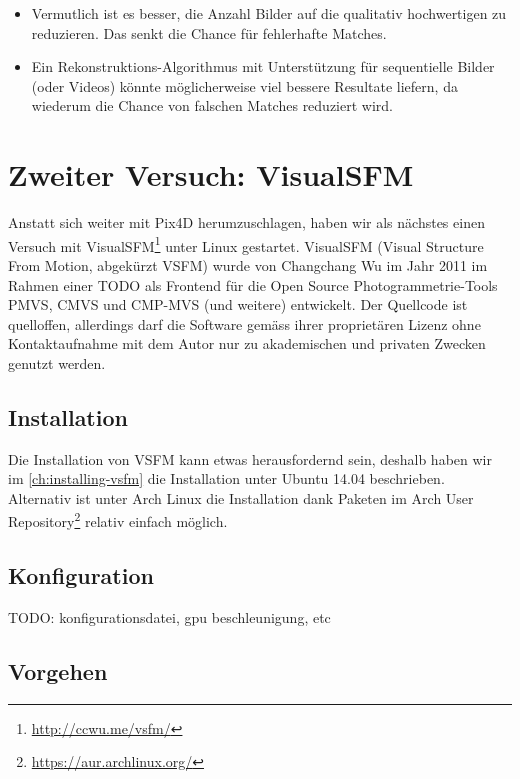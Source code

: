 \begin{itemize}
	\item Vermutlich ist es besser, die Anzahl Bilder auf die qualitativ
		hochwertigen zu reduzieren. Das senkt die Chance für fehlerhafte Matches.
	\item Ein Rekonstruktions-Algorithmus mit Unterstützung für sequentielle
		Bilder (oder Videos) könnte möglicherweise viel bessere Resultate liefern,
		da wiederum die Chance von falschen Matches reduziert wird.
\end{itemize}


\section{Zweiter Versuch: VisualSFM}

Anstatt sich weiter mit Pix4D herumzuschlagen, haben wir als nächstes einen
Versuch mit VisualSFM\footnote{\url{http://ccwu.me/vsfm/}} unter Linux
gestartet. VisualSFM (Visual Structure From Motion, abgekürzt VSFM) wurde von
Changchang Wu im Jahr 2011 im Rahmen einer TODO als Frontend für die Open Source
Photogrammetrie-Tools PMVS, CMVS und CMP-MVS (und weitere)
entwickelt\cite{wu:2011}\cite{wu:2015}. Der Quellcode ist quelloffen, allerdings
darf die Software gemäss ihrer proprietären Lizenz ohne Kontaktaufnahme mit dem
Autor nur zu akademischen und privaten Zwecken genutzt werden.

\subsection{Installation}

Die Installation von VSFM kann etwas herausfordernd sein, deshalb haben wir im
\autoref{ch:installing-vsfm} die Installation unter Ubuntu 14.04 beschrieben.
Alternativ ist unter Arch Linux die Installation dank Paketen im Arch User
Repository\footnote{\url{https://aur.archlinux.org/}} relativ einfach möglich.

\subsection{Konfiguration}

TODO: konfigurationsdatei, gpu beschleunigung, etc

\subsection{Vorgehen}


